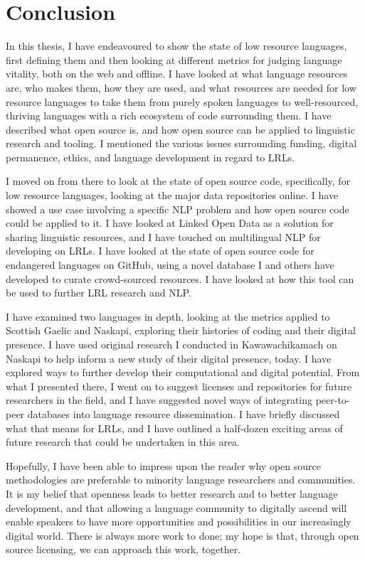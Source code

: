 \section{Conclusion}
\label{sec:conclusion}

In this thesis, I have endeavoured to show the state of low resource languages, first defining them and then looking at different metrics for judging language vitality, both on the web and offline. I have looked at what language resources are, who makes them, how they are used, and what resources are needed for low resource languages to take them from purely spoken languages to well-resourced, thriving languages with a rich ecosystem of code surrounding them. I have described what open source is, and how open source can be applied to linguistic research and tooling. I mentioned the various issues surrounding funding, digital permanence, ethics, and language development in regard to LRLs. 

I moved on from there to look at the state of open source code, specifically, for low resource languages, looking at the major data repositories online. I have showed a use case involving a specific NLP problem and how open source code could be applied to it. I have looked at Linked Open Data as a solution for sharing linguistic resources, and I have touched on multilingual NLP for developing on LRLs. I have looked at the state of open source code for endangered languages on GitHub, using a novel database I and others have developed to curate crowd-sourced resources. I have looked at how this tool can be used to further LRL research and NLP. 

I have examined two languages in depth, looking at the metrics applied to Scottish Gaelic and Naskapi, exploring their histories of coding and their digital presence. I have used original research I conducted in Kawawachikamach on Naskapi to help inform a new study of their digital presence, today. I have explored ways to further develop their computational and digital potential. From what I presented there, I went on to suggest licenses and repositories for future researchers in the field, and I have suggested novel ways of integrating peer-to-peer databases into language resource dissemination. I have briefly discussed what that means for LRLs, and I have outlined a half-dozen exciting areas of future research that could be undertaken in this area. 

Hopefully, I have been able to impress upon the reader why open source methodologies are preferable to minority language researchers and communities. It is my belief that openness leads to better research and to better language development, and that allowing a language community to digitally ascend will enable speakers to have more opportunities and possibilities in our increasingly digital world. There is always more work to done; my hope is that, through open source licensing, we can approach this work, together.